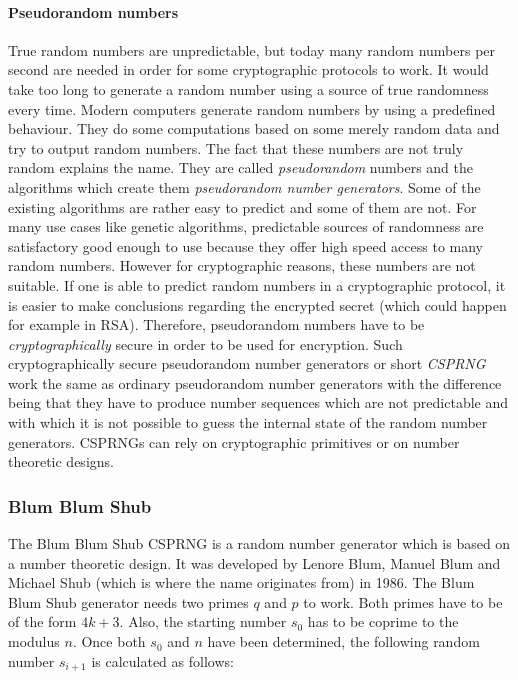 \paragraph{Pseudorandom numbers}
True random numbers are unpredictable, but today many random numbers per
second are needed in order for some cryptographic protocols to work. It would
take too long to generate a random number using a source of true randomness
every time. Modern computers generate random numbers by using a predefined behaviour.
They do some computations based on some merely random data and try to output
random numbers. The fact that these numbers are not truly random explains the name.
They are called \textit{pseudorandom} numbers  and the algorithms which create
them \textit{pseudorandom number generators}. Some of the existing algorithms
are rather easy to predict and some of them are not. For many use cases like
genetic algorithms, predictable sources of randomness are satisfactory
good enough to use because they offer high speed access to many random numbers.
However for cryptographic reasons, these numbers are not suitable. If one is
able to predict random numbers in a cryptographic protocol, it is easier to
make conclusions regarding the encrypted secret (which could happen for example
in RSA). Therefore, pseudorandom numbers have to be \textit{cryptographically}
secure in order to be used for encryption. Such cryptographically secure pseudorandom
number generators or short \textit{CSPRNG} work the same as ordinary pseudorandom
number generators with the difference being that they have to produce number sequences
which are not predictable and with which it is not possible to guess the internal
state of the random number generators. CSPRNGs can rely on cryptographic primitives
or on number theoretic designs.

\subsubsection{Blum Blum Shub}

The Blum Blum Shub CSPRNG is a random number generator which is based on a number
theoretic design. It was developed by Lenore Blum, Manuel Blum and Michael Shub
(which is where the name originates from) in 1986. The Blum Blum Shub generator needs
two primes $q$ and $p$ to work. Both primes have to be of the form $4k + 3$. Also,
the starting number $s_0$ has to be coprime to the modulus $n$.
Once both $s_0$ and $n$ have been determined, the following random number $s_{i+1}$ is
calculated as follows:

